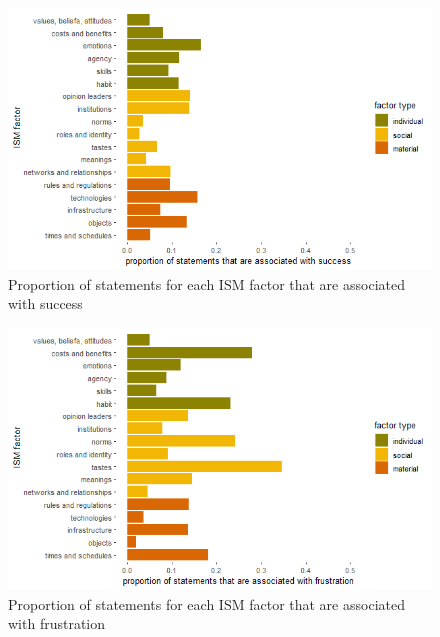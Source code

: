 \begin{figure}[!ht]
    \centering
    \includegraphics[width=1\linewidth]{figures/statements_associated_with_success.png}
    \caption{Proportion of statements for each ISM factor that are associated with success}
    \label{fig:ismsuccess}
\end{figure}

\begin{figure}[!ht]
    \centering
    \includegraphics[width=1\linewidth]{figures/statements_associated_with_frustration.png}
    \caption{Proportion of statements for each ISM factor that are associated with frustration}
    \label{fig:ismfrustration}
\end{figure}


